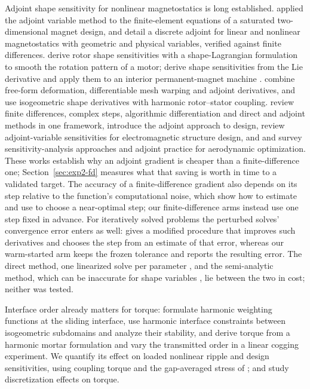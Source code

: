 \documentclass{anvil-paper}
\begin{document}
Adjoint shape sensitivity for nonlinear magnetostatics is long
established. \citet{park1992design} applied the adjoint variable method to
the finite-element equations of a saturated two-dimensional magnet design,
and \citet{elbechari2022adjoint} detail a discrete adjoint for linear and
nonlinear magnetostatics with geometric and physical variables, verified
against finite differences.
\citet{gangl2015shape} derive rotor shape sensitivities with a
shape-Lagrangian formulation to smooth the rotation pattern of a motor;
\citet{kuci2017design} derive shape sensitivities from the Lie derivative
and apply them to an interior permanent-magnet machine
\citep{kuci2016shape}. \citet{scotzniovsky2025} combine free-form
deformation, differentiable mesh warping and adjoint derivatives, and
\citet{merkel2021shape} use isogeometric shape derivatives with harmonic
rotor--stator coupling. \citet{martins2013review} review finite
differences, complex steps, algorithmic differentiation and direct and
adjoint methods in one framework, \citet{giles2000introduction} introduce
the adjoint approach to design, \citet{nikolova2004adjoint} review
adjoint-variable sensitivities for electromagnetic structure design, and
\citet{peter2010numerical} and \citet{kenway2019effective} survey
sensitivity-analysis approaches and adjoint practice for aerodynamic
optimization. These works establish why an adjoint gradient is cheaper than
a finite-difference one; Section~\ref{sec:exp2-fd} measures what that
saving is worth in time to a validated target. The accuracy of a
finite-difference gradient also depends on its step relative to the
function's computational noise, which \citet{more2011estimating} show how
to estimate and \citet{more2012estimating} use to choose a near-optimal
step; our finite-difference arms instead use one step fixed in advance.
For iteratively solved problems the perturbed solves' convergence error
enters as well: \citet{haftka1985sensitivity} gives a modified procedure
that improves such derivatives and \citet{eyi2011finite} chooses the step
from an estimate of that error, whereas our warm-started arm keeps the
frozen tolerance and reports the resulting error. The direct method, one
linearized solve per parameter \citep{adelman1986sensitivity}, and the
semi-analytic method, which can be inaccurate for shape variables
\citep{barthelemy1990accuracy}, lie between the two in cost; neither was
tested.

Interface order already matters for torque:
\citet{degersem2004harmonic} formulate harmonic weighting functions at the
sliding interface, \citet{bontinck2018isogeometric} use harmonic interface
constraints between isogeometric subdomains and analyze their stability,
and \citet{egger2022torque} derive torque from a harmonic mortar
formulation and vary the transmitted order in a linear cogging
experiment. We quantify its effect on loaded nonlinear ripple and design sensitivities,
using coupling torque and the gap-averaged stress of \citet{arkkio1987};
\citet{howe1992cogging} and \citet{arkkio2012proper} study discretization
effects on torque.
\end{document}
